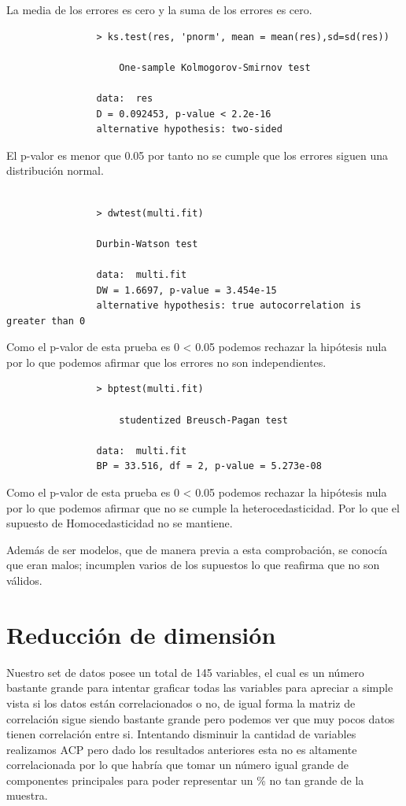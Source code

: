 \documentclass[a4paper,10pt,twocolumn]{article}
\begin{document}
\begin{itemize}
			La media de los errores es cero y la suma de los errores es cero.

			\begin{verbatim}
				> ks.test(res, 'pnorm', mean = mean(res),sd=sd(res))

					One-sample Kolmogorov-Smirnov test

				data:  res
				D = 0.092453, p-value < 2.2e-16
				alternative hypothesis: two-sided
			\end{verbatim}
			
			El p-valor es menor que 0.05 por tanto no se cumple que los errores siguen una distribución normal.

			\begin{verbatim}
				
				> dwtest(multi.fit)

				Durbin-Watson test

				data:  multi.fit
				DW = 1.6697, p-value = 3.454e-15
				alternative hypothesis: true autocorrelation is greater than 0

			\end{verbatim}

			Como el p-valor de esta prueba es 0 < 0.05 podemos rechazar la hipótesis nula por lo que 
			podemos afirmar que los errores no son independientes. 

			\begin{verbatim}
				> bptest(multi.fit)

					studentized Breusch-Pagan test

				data:  multi.fit
				BP = 33.516, df = 2, p-value = 5.273e-08
			\end{verbatim}

			Como el p-valor de esta prueba es 0 < 0.05 podemos rechazar la hipótesis nula por lo que podemos 
			afirmar que no se cumple la heterocedasticidad. Por lo que el supuesto de Homocedasticidad no se mantiene.
	\end{itemize}

	Además de ser modelos, que de manera previa a esta comprobación, se conocía que eran malos; incumplen varios de los supuestos lo que reafirma que no son válidos.

\section{Reducción de dimensión}\label{sec:ex1}
	Nuestro set de datos posee un total de 145 variables, el cual es un número bastante grande  para intentar graficar todas las variables para apreciar a simple vista si los datos están correlacionados o no, de igual forma la matriz de correlación sigue siendo bastante grande pero podemos ver que muy pocos datos tienen correlación entre si. Intentando disminuir la cantidad de variables realizamos ACP pero dado los resultados anteriores esta no es altamente correlacionada por lo que habría que tomar un número igual grande de componentes principales para poder representar un \% no tan grande de la muestra.
\end{document}
